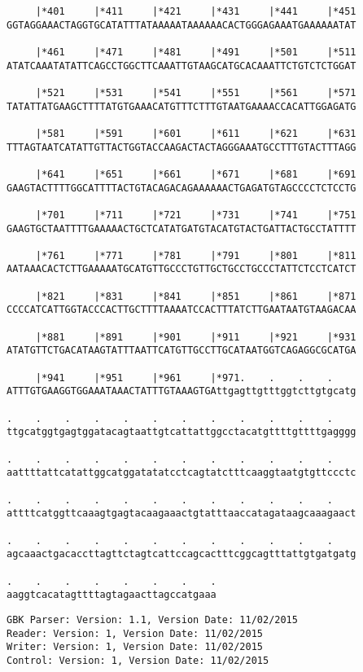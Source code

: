 \documentclass{article}
\begin{document}
\begin{Verbatim}
     |*401     |*411     |*421     |*431     |*441     |*451
GGTAGGAAACTAGGTGCATATTTATAAAAATAAAAAACACTGGGAGAAATGAAAAAATAT
  
     |*461     |*471     |*481     |*491     |*501     |*511
ATATCAAATATATTCAGCCTGGCTTCAAATTGTAAGCATGCACAAATTCTGTCTCTGGAT
  
     |*521     |*531     |*541     |*551     |*561     |*571
TATATTATGAAGCTTTTATGTGAAACATGTTTCTTTGTAATGAAAACCACATTGGAGATG
  
     |*581     |*591     |*601     |*611     |*621     |*631
TTTAGTAATCATATTGTTACTGGTACCAAGACTACTAGGGAAATGCCTTTGTACTTTAGG
  
     |*641     |*651     |*661     |*671     |*681     |*691
GAAGTACTTTTGGCATTTTACTGTACAGACAGAAAAAACTGAGATGTAGCCCCTCTCCTG
  
     |*701     |*711     |*721     |*731     |*741     |*751
GAAGTGCTAATTTTGAAAAACTGCTCATATGATGTACATGTACTGATTACTGCCTATTTT
  
     |*761     |*771     |*781     |*791     |*801     |*811
AATAAACACTCTTGAAAAATGCATGTTGCCCTGTTGCTGCCTGCCCTATTCTCCTCATCT
  
     |*821     |*831     |*841     |*851     |*861     |*871
CCCCATCATTGGTACCCACTTGCTTTTAAAATCCACTTTATCTTGAATAATGTAAGACAA
  
     |*881     |*891     |*901     |*911     |*921     |*931
ATATGTTCTGACATAAGTATTTAATTCATGTTGCCTTGCATAATGGTCAGAGGCGCATGA
  
     |*941     |*951     |*961     |*971.    .    .    .    
ATTTGTGAAGGTGGAAATAAACTATTTGTAAAGTGAttgagttgtttggtcttgtgcatg
  
.    .    .    .    .    .    .    .    .    .    .    .    
ttgcatggtgagtggatacagtaattgtcattattggcctacatgttttgttttgagggg
  
.    .    .    .    .    .    .    .    .    .    .    .    
aattttattcatattggcatggatatatcctcagtatctttcaaggtaatgtgttccctc
  
.    .    .    .    .    .    .    .    .    .    .    .    
attttcatggttcaaagtgagtacaagaaactgtatttaaccatagataagcaaagaact
  
.    .    .    .    .    .    .    .    .    .    .    .    
agcaaactgacaccttagttctagtcattccagcactttcggcagtttattgtgatgatg
  
.    .    .    .    .    .    .    .
aaggtcacatagttttagtagaacttagccatgaaa
\end{Verbatim}
\newpage
\begin{Verbatim}
GBK Parser: Version: 1.1, Version Date: 11/02/2015
Reader: Version: 1, Version Date: 11/02/2015
Writer: Version: 1, Version Date: 11/02/2015
Control: Version: 1, Version Date: 11/02/2015
\end{Verbatim}
\end{document}
